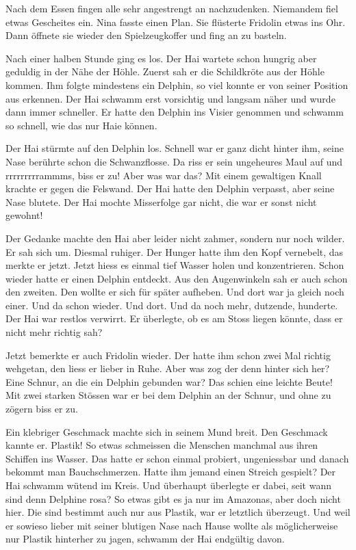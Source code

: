 Nach dem Essen fingen alle sehr angestrengt an nachzudenken. Niemandem fiel etwas Gescheites ein. Nina fasste einen Plan. Sie flüsterte Fridolin etwas ins Ohr. Dann öffnete sie wieder den Spielzeugkoffer und fing an zu basteln. 

Nach einer halben Stunde ging es los. Der Hai wartete schon hungrig aber geduldig in der Nähe der Höhle. Zuerst sah er die Schildkröte aus der Höhle kommen. Ihm folgte mindestens ein Delphin, so viel konnte er von seiner Position aus erkennen. Der Hai schwamm erst vorsichtig und langsam näher und wurde dann immer schneller. Er hatte den Delphin ins Visier genommen und schwamm so schnell, wie das nur Haie können.

Der Hai stürmte auf den Delphin los. Schnell war er ganz dicht hinter ihm, seine Nase berührte schon die Schwanzflosse. Da riss er sein ungeheures Maul auf und rrrrrrrrrammms, biss er zu! Aber was war das? Mit einem gewaltigen Knall krachte er gegen die Felswand. Der Hai hatte den Delphin verpasst, aber seine Nase blutete. Der Hai mochte Misserfolge gar nicht, die war er sonst nicht gewohnt!

Der Gedanke machte den Hai aber leider nicht zahmer, sondern nur noch wilder. Er sah sich um. Diesmal ruhiger. Der Hunger hatte ihm den Kopf vernebelt, das merkte er jetzt. Jetzt hiess es einmal tief Wasser holen und konzentrieren. Schon wieder hatte er einen Delphin entdeckt. Aus den Augenwinkeln sah er auch schon den zweiten. Den wollte er sich für später aufheben. Und dort war ja gleich noch einer. Und da schon wieder. Und dort. Und da noch mehr, dutzende, hunderte. Der Hai war restlos verwirrt. Er überlegte, ob es am Stoss liegen könnte, dass er nicht mehr richtig sah?

Jetzt bemerkte er auch Fridolin wieder. Der hatte ihm schon zwei Mal richtig wehgetan, den liess er lieber in Ruhe. Aber was zog der denn hinter sich her? Eine Schnur, an die ein Delphin gebunden war? Das schien eine leichte Beute! Mit zwei starken Stössen war er bei dem Delphin an der Schnur, und ohne zu zögern biss er zu.

Ein klebriger Geschmack machte sich in seinem Mund breit. Den Geschmack kannte er. Plastik! So etwas schmeissen die Menschen manchmal aus ihren Schiffen ins Wasser. Das hatte er schon einmal probiert, ungeniessbar und danach bekommt man Bauchschmerzen. Hatte ihm jemand einen Streich gespielt? Der Hai schwamm wütend im Kreis. Und überhaupt überlegte er dabei, seit wann sind denn Delphine rosa? So etwas gibt es ja nur im Amazonas, aber doch nicht hier. Die sind bestimmt auch nur aus Plastik, war er letztlich überzeugt.  Und weil er sowieso lieber mit seiner blutigen Nase nach Hause wollte als möglicherweise nur Plastik hinterher zu jagen, schwamm der Hai endgültig davon.

